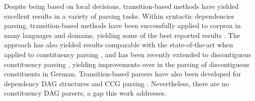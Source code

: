 \documentclass[11pt]{article}
\newcommand{\oa}[1]{\footnote{\color{red} #1}}
\begin{document}
Despite being based on local decisions, transition-based methods have yielded excellent
results in a variety of parsing tasks. Within syntactic dependencies parsing, transition-based methods
have been successfully applied to corproa in many languages and domains, yielding some
of the best reported results \cite{dyer2015transition,ballesteros2015improved}. 
The approach has also yielded results comparable with the state-of-the-art when applied
to constituency parsing \cite{sagae2005classifier,zhu2013fast}, and has been recently extended to
discontiguous constituency parsing \cite{maier2015discontinuous},
yielding improvements over in the parsing of discontiguous constituents in German.
Transition-based parsers have also been developed for dependency DAG structures
\cite{sagae2008shift,tokgoz2015transition} and CCG parsing \cite{ambati2015incremental}.
Nevertheless, there are no constituency DAG parsers, a gap this work addresses.

%  


\end{document}
